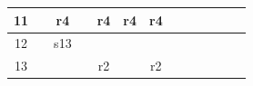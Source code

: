 \documentclass{article}
\begin{document}
\begin{latin}
\begin{table}[H]
\begin{tabular}{|ccccccccccccc|}
\multicolumn{1}{|c|}{{\color[HTML]{0000FF} 11}}        & \multicolumn{1}{c|}{}           & \multicolumn{1}{c|}{r4}         & \multicolumn{1}{c|}{}           & \multicolumn{1}{c|}{r4}         & \multicolumn{1}{c|}{r4}         & \multicolumn{1}{c|}{r4}                         & \multicolumn{1}{c|}{}            & \multicolumn{1}{c|}{}                         & \multicolumn{1}{c|}{}                         & \multicolumn{1}{c|}{}                          & \multicolumn{1}{c|}{}                          &                          \\ \hline
\multicolumn{1}{|c|}{{\color[HTML]{0000FF} 12}}        & \multicolumn{1}{c|}{}           & \multicolumn{1}{c|}{s13}        & \multicolumn{1}{c|}{}           & \multicolumn{1}{c|}{}           & \multicolumn{1}{c|}{}           & \multicolumn{1}{c|}{}                           & \multicolumn{1}{c|}{}            & \multicolumn{1}{c|}{}                         & \multicolumn{1}{c|}{}                         & \multicolumn{1}{c|}{}                          & \multicolumn{1}{c|}{}                          &                          \\ \hline
\multicolumn{1}{|c|}{{\color[HTML]{0000FF} 13}}        & \multicolumn{1}{c|}{}           & \multicolumn{1}{c|}{}           & \multicolumn{1}{c|}{}           & \multicolumn{1}{c|}{r2}         & \multicolumn{1}{c|}{}           & \multicolumn{1}{c|}{r2}                         & \multicolumn{1}{c|}{}            & \multicolumn{1}{c|}{}                         & \multicolumn{1}{c|}{}                         & \multicolumn{1}{c|}{}                          & \multicolumn{1}{c|}{}                          &                          \\ \hline
\end{tabular}
\end{table}
\end{latin}
\end{document}
